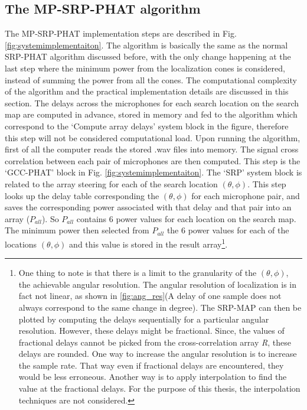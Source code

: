 \subsection{The MP-SRP-PHAT algorithm}

The MP-SRP-PHAT implementation steps are described in Fig. \ref{fig:systemimplementaiton}. The algorithm is basically the same as the normal SRP-PHAT algorithm discussed before, with the only change happening at the last step where the minimum power from the localization cones is considered, instead of summing the power from all the cones.  %
The computational complexity of the algorithm and the practical implementation details are discussed in this section. The delays across the microphones for each search location on the search map are computed in advance, stored in memory and fed to the algorithm which correspond to the `Compute array delays' system block in the figure, therefore this step will not be considered computational load. Upon running the algorithm, first of all the computer reads the stored .wav files into memory. The signal cross correlation between each pair of microphones are then computed. This step is the `GCC-PHAT' block in Fig. \ref{fig:systemimplementaiton}. The `SRP' system block is related to the array steering for each of the search location $(\theta,\phi)$. This step looks up the delay table corresponding the $(\theta,\phi)$ for each microphone pair, and saves the corresponding power associated with that delay and that pair into an array ($P_{all}$). So $P_{all}$ contains 6 power values for each location on the search map. The minimum power then selected from $P_{all}$ the 6 power values for each of the locations $(\theta,\phi)$ and this value is stored in the result array\footnote{One thing to note is that there is a limit to the granularity of the $(\theta,\phi)$, the achievable angular resolution. The angular resolution of localization is in fact not linear, as shown in \ref{fig:ang_res}(A delay of one sample does not always correspond to the same change in degree). The SRP-MAP can then be plotted by computing the delays sequentially for a particular angular resolution. However, these delays might be fractional. Since, the values of fractional delays cannot be picked from the cross-correlation array \textit{R}, these delays are rounded. One way to increase the angular resolution is to increase the sample rate. That way even if fractional delays are encountered, they would be less erroneous. Another way is to apply interpolation to find the value at the fractional delays. For the purpose of this thesis, the interpolation techniques are not considered.}.

